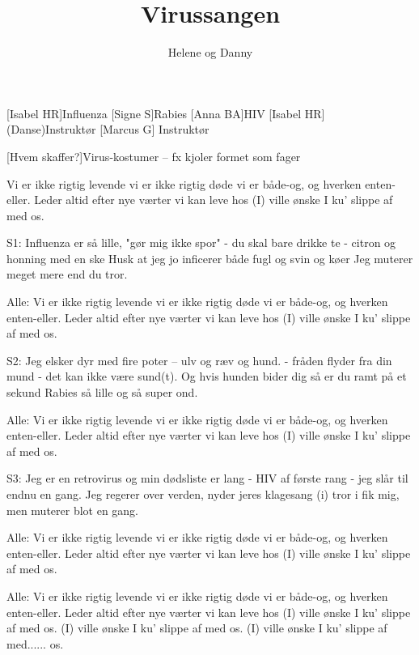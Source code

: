 \documentclass[a4paper,11pt]{article}
\title{Virussangen}
\author{Helene og Danny}
\begin{document}
\maketitle

\begin{roles}
[Isabel HR]Influenza
[Signe S]Rabies
[Anna BA]HIV
[Isabel HR] (Danse)Instruktør
[Marcus G] Instruktør
\end{roles}

\begin{props}
[Hvem skaffer?]Virus-kostumer – fx kjoler formet som fager 
\end{props}

\begin{song}


  Vi er ikke rigtig levende 
       vi er ikke rigtig døde
       vi er både-og, og hverken enten-eller. 
       Leder altid efter nye værter 
       vi kan leve hos 
       (I) ville ønske I ku' slippe af med os. 

S1: Influenza er så lille, "gør mig ikke spor" 
               - du skal bare drikke te 
               - citron og honning med en ske 
               Husk at jeg jo inficerer både fugl og svin og køer
               Jeg muterer meget mere end du tror. 

Alle: Vi er ikke rigtig levende 
       vi er ikke rigtig døde
       vi er både-og, og hverken enten-eller. 
       Leder altid efter nye værter 
vi kan leve hos 
       (I) ville ønske I ku' slippe af med os. 

S2: Jeg elsker dyr med fire poter -- ulv og ræv og hund. 
               - fråden flyder fra din mund 
               - det kan ikke være sund(t). 
              Og hvis hunden bider dig så er du ramt på et sekund
              Rabies så lille og så super ond. 

Alle:  Vi er ikke rigtig levende 
        vi er ikke rigtig døde
        vi er både-og, og hverken enten-eller. 
        Leder altid efter nye værter 
        vi kan leve hos 
       (I) ville ønske I ku' slippe af med os. 

S3: Jeg er en retrovirus og min dødsliste er lang 
              - HIV af første rang 
              - jeg slår til endnu en gang. 
              Jeg regerer over verden, nyder jeres klagesang 
              (i) tror i fik mig, men muterer blot en gang. 

Alle:  Vi er ikke rigtig levende 
        vi er ikke rigtig døde
        vi er både-og, og hverken enten-eller. 
        Leder altid efter nye værter 
       vi kan leve hos 
       (I) ville ønske I ku' slippe af med os.

Alle: Vi er ikke rigtig levende 
       vi er ikke rigtig døde
       vi er både-og, og hverken enten-eller. 
       Leder altid efter nye værter
       vi kan leve hos 
       (I) ville ønske I ku' slippe af med os. 
       (I) ville ønske I ku' slippe af med os. 
       (I) ville ønske I ku' slippe af med...... os. 
\end{song}
\end{document}
